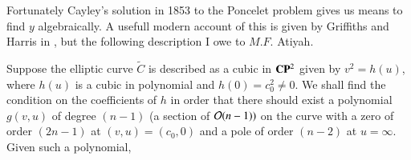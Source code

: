 Fortunately Cayley's solution in 1853 to the Poncelet problem gives us means to find $y$ algebraically. A usefull modern account of this is given by Griffiths and Harris in \cite{art7-key5}, but the following description I owe to $M. F.$ Atiyah.

Suppose the elliptic curve $\tilde{C}$ is described as a cubic in $\mathbf{C}\mathbf{P}^{2}$ given by $v^{2}=h(u)$, where $h(u)$ is a cubic in polynomial and $h(0)= c_{0}^{2} \neq 0$. We shall find the condition on the coefficients of $h$ in order that there should exist a polynomial $g(v,u)$ of degree $(n-1)$ (a section of $\mathcal{O}(n-1))$ on the curve with a zero of order $(2n-1)$ at $(v,u)=(c_{0},0)$ and a pole of order $(n-2)$ at $u=\infty$. Given such a polynomial,

